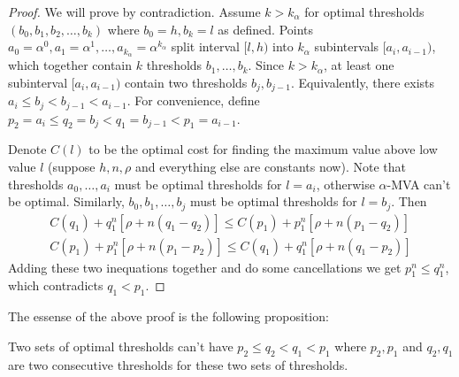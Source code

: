 \begin{proof}
We will prove by contradiction. Assume $k > k_\alpha$ for optimal thresholds
$(b_0, b_1, b_2, \ldots, b_k)$ where $b_0 = h, b_k = l$ as defined.  Points
$a_0 = \alpha^0, a_1 = \alpha^1, \ldots, a_{k_\alpha} = \alpha^{k_\alpha}$
split interval $[l, h)$ into $k_\alpha$ subintervals $[a_i, a_{i-1})$, which
together contain $k$ thresholds $b_1, \ldots, b_k$. Since $k > k_\alpha$, at
least one subinterval $[a_i, a_{i-1})$ contain two thresholds $b_j, b_{j-1}$.
Equivalently, there exists $a_i \leq b_j < b_{j-1} < a_{i-1}$.  For
convenience, define $p_2 = a_i \leq q_2 = b_j < q_1 = b_{j-1} < p_1 = a_{i-1}$.

Denote $C(l)$ to be the optimal cost for finding the maximum value above low
value $l$ (suppose $h, n, \rho$ and everything else are constants now). Note
that thresholds $a_0, \ldots, a_i$ must be optimal thresholds for $l = a_i$,
otherwise $\alpha$-MVA can't be optimal.  Similarly, $b_0, b_1, \ldots, b_j$
must be optimal thresholds for $l = b_j$.  Then 
\begin{align*}
  C(q_1) + q_1^n [\rho+n(q_1-q_2)] \leq C(p_1) + p_1^n [\rho + n(p_1-q_2)]\\
  C(p_1) + p_1^n [\rho+n(p_1-p_2)] \leq C(q_1) + q_1^n [\rho + n(q_1-p_2)]
\end{align*}
Adding these two inequations together and do some cancellations we get
$p_1^n \leq q_1^n$, which contradicts $q_1 < p_1$.
\end{proof}

The essense of the above proof is the following proposition:

\begin{proposition}\label{prop:thresholds}
Two sets of optimal thresholds can't have $p_2 \leq q_2 < q_1 < p_1$ where
$p_2, p_1$ and $q_2, q_1$ are two consecutive thresholds for these two sets of
thresholds.
\end{proposition}

